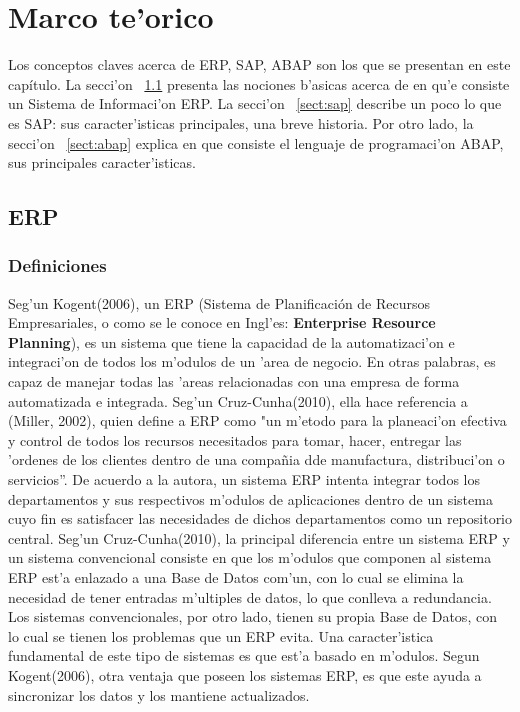 \chapter{Marco te'orico} \label{chap:ssimilar}



Los conceptos claves acerca de ERP, SAP, ABAP son los que se presentan en este capítulo.
\newline
\newline
La secci'on ~\ref{sect:erp} presenta las nociones b'asicas acerca de en qu'e consiste un Sistema de Informaci'on ERP. La secci'on 
~\ref{sect:sap} describe un poco lo que es SAP: sus caracter'isticas principales, una  breve historia. Por otro lado, la secci'on ~\ref{sect:abap} explica en que consiste el lenguaje de programaci'on ABAP, sus principales caracter'isticas. 

\section{ ERP} \label{sect:erp}


\subsection{Definiciones} \label{subsect:defprop}


Seg'un Kogent(2006), un ERP (Sistema de Planificación de Recursos Empresariales, o como se le conoce en Ingl'es: \textbf{Enterprise Resource Planning}), es un sistema que tiene la capacidad de la automatizaci'on e integraci'on de todos los m'odulos de un 'area de negocio. En otras palabras, es capaz de manejar todas las 'areas relacionadas con una empresa de forma automatizada e integrada. 
\newline
\newline
\indent Seg'un Cruz-Cunha(2010), ella hace referencia a (Miller, 2002), quien define a ERP  como "un m'etodo para la planeaci'on efectiva y control de todos los recursos necesitados para tomar, hacer, entregar las 'ordenes de los clientes dentro de una compa\~nia dde manufactura, distribuci'on o servicios''. De acuerdo a la autora, un sistema ERP intenta integrar todos los departamentos y sus respectivos m'odulos de aplicaciones dentro de un sistema cuyo fin es satisfacer las necesidades de dichos departamentos como un repositorio central. 
\newline
\newline
\indent Seg'un Cruz-Cunha(2010), la principal diferencia entre un sistema ERP y un sistema convencional consiste en que los m'odulos que componen al sistema ERP est'a enlazado a una Base de Datos com'un, con lo cual se elimina la necesidad de tener entradas m'ultiples de datos, lo que conlleva a redundancia. Los sistemas convencionales, por otro lado, tienen su propia Base de Datos, con lo cual se tienen los problemas que un ERP evita.
Una caracter'istica fundamental de este tipo de sistemas es que est'a basado en m'odulos. 
\newline
\newline
\indent Segun Kogent(2006), otra ventaja que poseen los sistemas ERP, es que este ayuda a sincronizar los datos y los mantiene actualizados.
